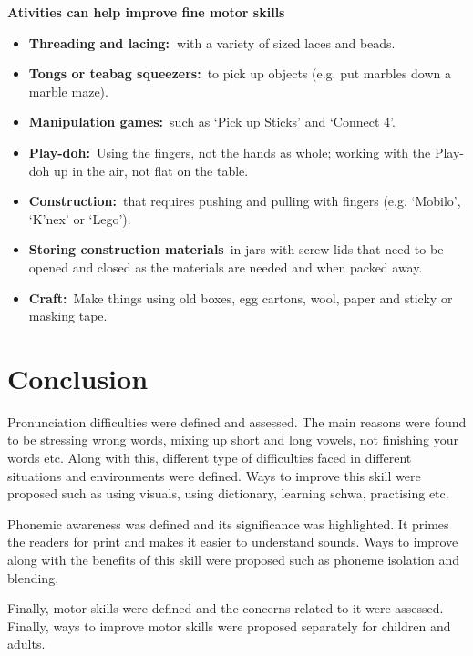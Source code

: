 \textbf{Ativities can help improve fine motor skills}

\begin{itemize}
\item
  \textbf{Threading and lacing:~}with a variety of sized laces and
  beads.
\item
  \textbf{Tongs or teabag squeezers:}~to pick up objects (e.g. put
  marbles down a marble maze).
\item
  \textbf{Manipulation games:}~such as `Pick up Sticks' and `Connect 4'.
\item
  \textbf{Play-doh:}~Using the fingers, not the hands as whole; working
  with the Play-doh up in the air, not flat on the table.
\item
  \textbf{Construction:}~that requires pushing and pulling with fingers
  (e.g. `Mobilo', `K'nex' or `Lego').
\item
  \textbf{Storing construction materials}~in jars with screw lids that
  need to be opened and closed as the materials are needed and when
  packed away.
\item
  \textbf{Craft:}~Make things using old boxes, egg cartons, wool, paper
  and sticky or masking tape.
\end{itemize}

\section{Conclusion}


Pronunciation difficulties were defined and assessed. The main reasons
were found to be stressing wrong words, mixing up short and long vowels,
not finishing your words etc. Along with this, different type of
difficulties faced in different situations and environments were
defined. Ways to improve this skill were proposed such as using visuals,
using dictionary, learning schwa, practising etc.

Phonemic awareness was defined and its significance was highlighted. It
primes the readers for print and makes it easier to understand sounds.
Ways to improve along with the benefits of this skill were proposed such
as phoneme isolation and blending.

Finally, motor skills were defined and the concerns related to it were
assessed. Finally, ways to improve motor skills were proposed separately
for children and adults.



